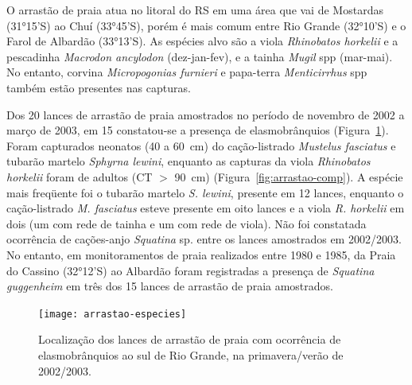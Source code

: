 \documentclass[a4paper,11pt,twoside,showtrims,onecolumn,openright,final]{memoir}
\begin{document}
O arrastão de praia atua no litoral do RS em uma área que vai de Mostardas (31°15'S) 
ao Chuí (33°45'S), porém é mais comum entre Rio Grande (32°10'S) e o Farol de Albardão (33°13'S). 
As espécies alvo são a viola \emph{Rhinobatos horkelii} e a pescadinha \emph{Macrodon ancylodon}
(dez-jan-fev), e a tainha \emph{Mugil} spp (mar-mai). No entanto, 
corvina \emph{Micropogonias furnieri} e papa-terra \emph{Menticirrhus} spp  
também estão presentes nas capturas.

Dos 20 lances de arrastão de praia amostrados no período de novembro de 2002 
a março de 2003, em 15 constatou-se a presença de elasmobrânquios (Figura~\ref{fig:arrastao-mapaespecies}).  
Foram capturados neonatos (40 a 60~cm) do cação-listrado \emph{Mustelus fasciatus} 
e tubarão martelo \emph{Sphyrna lewini}, enquanto as capturas 
da viola \emph{Rhinobatos horkelii} foram de adultos (CT $>$ 90~cm) (Figura~\ref{fig:arrastao-comp}).
A espécie mais freqüente foi o tubarão martelo \emph{S. lewini}, 
presente em 12 lances, enquanto o cação-listrado \emph{M. fasciatus} esteve
presente em oito lances e a viola \emph{R. horkelii} em dois (um com rede de tainha
e um com rede de viola). Não foi constatada ocorrência de
cações-anjo \emph{Squatina} sp. entre os lances amostrados em 2002/2003. No entanto,
em monitoramentos de praia realizados entre 1980 e 1985, da Praia do Cassino (32°12'S)
ao Albardão foram registradas a presença de \emph{Squatina guggenheim} em três 
dos 15 lances de arrastão de praia amostrados.


\begin{figure}
\begin{center}
\texttt{[image: arrastao-especies]}
\end{center}
\caption[Localização dos lances de arrastão de praia com ocorrência de elasmobrânquios]
        {Localização dos lances de arrastão de praia com ocorrência de elasmobrânquios
         ao sul de Rio Grande, na primavera/verão de 2002/2003.}
\label{fig:arrastao-mapaespecies}	 
\end{figure}


\end{document}
